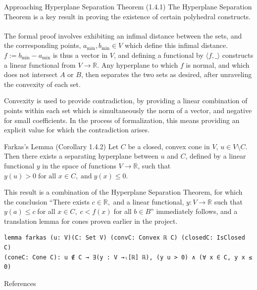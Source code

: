 \documentclass[final]{beamer}
\newlength{\colwidth}
\begin{document}
\begin{frame}[fragile]
\begin{columns}[t]
\begin{column}{\colwidth}
        \begin{block}{Approaching Hyperplane Separation Theorem (1.4.1)}
            The Hyperplane Separation Theorem is a key result in proving the existence of certain polyhedral constructs.
            \\\\The formal proof involves exhibiting an infimal distance between the sets, and the corresponding points, $a_{\text{min}}, b_{\text{min}} \in V$ which define this infimal distance.
            $f:= b_{\text{min}}-a_{\text{min}}$ is thus a vector in $V$, and defining a functional by $\langle f, \_\rangle$ constructs a linear functional from $V\to \mathbb{R}$. Any hyperplane to which $f$
            is normal, and which does not intersect $A$ or $B$, then separates the two sets as desired, after unraveling the convexity of each set.
            
            Convexity is used to provide contradiction, by providing a linear combination of points within each set which is simultaneously the norm of a vector,
            and negative for small coefficients. In the process of formalization, this means providing an explicit value for which the contradiction arises.         
        \end{block}
        
         
        \begin{exampleblock}{Farkas's Lemma (Corollary 1.4.2)}
          Let $C$ be a closed, convex cone in $V$, $u\in V\setminus C$. Then there exists a separating hyperplane between $u$ and $C$, defined by a linear functional $y$ in the space of functions $V\to \mathbb{R}$, such that $
          y(u)> 0 \; \text{for all } x\in C, \; \text{and} \; y(x) \le 0
          $.
        \end{exampleblock}
            This result is  a combination of the Hyperplane Separation Theorem, for which the conclusion ``There exists $
              c\in \mathbb{R}, $ and a linear functional, $ y: V\to \mathbb{R} $ such that $ y(a) \le c\; $for all $ x\in C, \; c < f(x)\; $for all $  b\in B
            $'' immediately follows, and a translation lemma for cones proven earlier in the project.
\begin{Verbatim}
lemma farkas (u: V)(C: Set V) (convC: Convex ℝ C) (closedC: IsClosed C)
(coneC: Cone C): u ∉ C → ∃(y : V →ₗ[ℝ] ℝ), (y u > 0) ∧ (∀ x ∈ C, y x ≤ 0)
\end{Verbatim}  
           
            
        \begin{block}{References}
        \nocite{liunotes}
        \begin{bibdiv}
        \begin{biblist}
        \end{biblist}
        \end{bibdiv}
        \end{block}
\end{column}


\end{columns}
\end{frame}
\end{document}
